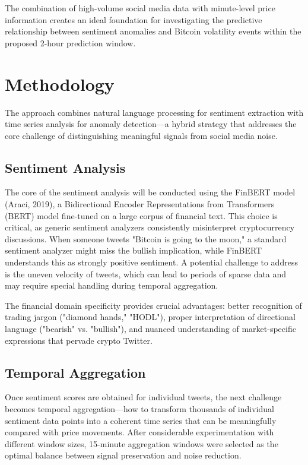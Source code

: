 \documentclass[11pt,twocolumn]{article}
\begin{document}
The combination of high-volume social media data with minute-level price information creates an ideal foundation for investigating the predictive relationship between sentiment anomalies and Bitcoin volatility events within the proposed 2-hour prediction window.

\section{Methodology}
The approach combines natural language processing for sentiment extraction with time series analysis for anomaly detection—a hybrid strategy that addresses the core challenge of distinguishing meaningful signals from social media noise.

\subsection{\textbf{Sentiment Analysis}}
The core of the sentiment analysis will be conducted using the FinBERT model (Araci, 2019), a Bidirectional Encoder Representations from Transformers (BERT) model fine-tuned on a large corpus of financial text. This choice is critical, as generic sentiment analyzers consistently misinterpret cryptocurrency discussions. When someone tweets "Bitcoin is going to the moon," a standard sentiment analyzer might miss the bullish implication, while FinBERT understands this as strongly positive sentiment. A potential challenge to address is the uneven velocity of tweets, which can lead to periods of sparse data and may require special handling during temporal aggregation.

The financial domain specificity provides crucial advantages: better recognition of trading jargon ("diamond hands," "HODL"), proper interpretation of directional language ("bearish" vs. "bullish"), and nuanced understanding of market-specific expressions that pervade crypto Twitter.

\subsection{\textbf{Temporal Aggregation}}
Once sentiment scores are obtained for individual tweets, the next challenge becomes temporal aggregation—how to transform thousands of individual sentiment data points into a coherent time series that can be meaningfully compared with price movements. After considerable experimentation with different window sizes, 15-minute aggregation windows were selected as the optimal balance between signal preservation and noise reduction.
\end{document}
